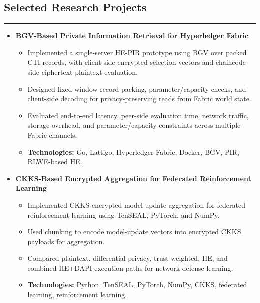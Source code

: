 \documentclass[11pt,letterpaper]{article}
\begin{document}
\vspace{0.2cm}

\subsection*{\Large Selected Research Projects}
\vspace{-0.5em}
\hrule
\vspace{0.3em}

\begin{itemize}[leftmargin=0em, itemsep=0.6em]
    \parskip=0.1em
    \renewcommand\labelitemi{}

    \item
    \textbf{BGV-Based Private Information Retrieval for Hyperledger Fabric}
    \begin{itemize}[leftmargin=1.2em, itemsep=0.1em]
        \renewcommand\labelitemi{$\bullet$}
        \item Implemented a single-server HE-PIR prototype using BGV over packed CTI records, with client-side encrypted selection vectors and chaincode-side ciphertext-plaintext evaluation.
        \item Designed fixed-window record packing, parameter/capacity checks, and client-side decoding for privacy-preserving reads from Fabric world state.
        \item Evaluated end-to-end latency, peer-side evaluation time, network traffic, storage overhead, and parameter/capacity constraints across multiple Fabric channels.
        \item \textbf{Technologies:} Go, Lattigo, Hyperledger Fabric, Docker, BGV, PIR, RLWE-based HE.
    \end{itemize}

    \item
    \textbf{CKKS-Based Encrypted Aggregation for Federated Reinforcement Learning}
    \begin{itemize}[leftmargin=1.2em, itemsep=0.1em]
        \renewcommand\labelitemi{$\bullet$}
        \item Implemented CKKS-encrypted model-update aggregation for federated reinforcement learning using TenSEAL, PyTorch, and NumPy.
        \item Used chunking to encode model-update vectors into encrypted CKKS payloads for aggregation.
        \item Compared plaintext, differential privacy, trust-weighted, HE, and combined HE+DAPI execution paths for network-defense learning.
        \item \textbf{Technologies:} Python, TenSEAL, PyTorch, NumPy, CKKS, federated learning, reinforcement learning.
    \end{itemize}

\end{itemize}
\end{document}
